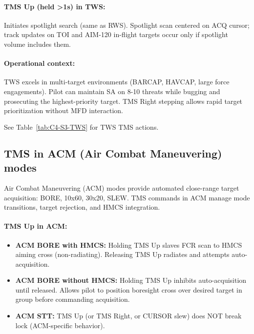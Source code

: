 \documentclass[11pt, a4paper, twoside]{report}
\begin{document}
\paragraph{TMS Up (held >1s) in TWS:}
Initiates spotlight search (same as RWS). Spotlight scan centered on ACQ cursor; track updates on TOI and AIM-120 in-flight targets occur only if spotlight volume includes them.

\paragraph{Operational context:}
TWS excels in multi-target environments (BARCAP, HAVCAP, large force engagements). Pilot can maintain SA on 8-10 threats while bugging and prosecuting the highest-priority target. TMS Right stepping allows rapid target prioritization without MFD interaction.

See Table~\ref{tab:C4-S3-TWS} for TWS TMS actions.

\subsection{TMS in ACM (Air Combat Maneuvering) modes}
\label{sec:C4-S3-S4}

Air Combat Maneuvering (ACM) modes provide automated close-range target acquisition: BORE, 10x60, 30x20, SLEW. TMS commands in ACM manage mode transitions, target rejection, and HMCS integration.

\paragraph{TMS Up in ACM:}
\begin{itemize}
    \item \textbf{ACM BORE with HMCS:} Holding TMS Up slaves FCR scan to HMCS aiming cross (non-radiating). Releasing TMS Up radiates and attempts auto-acquisition.
    \item \textbf{ACM BORE without HMCS:} Holding TMS Up inhibits auto-acquisition until released. Allows pilot to position boresight cross over desired target in group before commanding acquisition.
    \item \textbf{ACM STT:} TMS Up (or TMS Right, or CURSOR slew) does NOT break lock (ACM-specific behavior).
\end{itemize}
\end{document}
